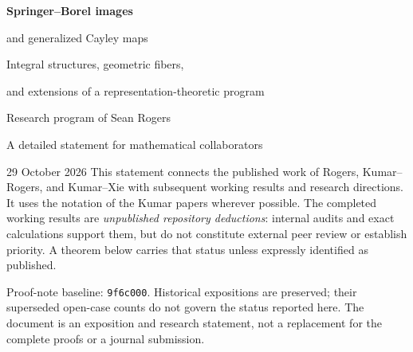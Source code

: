 \documentclass[11pt,letterpaper]{article}
\begin{document}
\hypersetup{pageanchor=false}
\begin{titlepage}
\vspace*{0.6in}
{\Huge\bfseries Springer--Borel images\par and generalized Cayley maps\par}
\vspace{0.3in}
{\Large Integral structures, geometric fibers,\par and extensions of a representation-theoretic program\par}
\vspace{0.4in}
{\large Research program of Sean Rogers\par}
{\large A detailed statement for mathematical collaborators\par}
\vspace{0.2in}
29 October 2026
\vfill
\noindent This statement connects the published work of Rogers, Kumar--Rogers, and Kumar--Xie with subsequent working results and research directions. It uses the notation of the Kumar papers wherever possible. The completed working results are \emph{unpublished repository deductions}: internal audits and exact calculations support them, but do not constitute external peer review or establish priority. A theorem below carries that status unless expressly identified as published.
\par\medskip
\noindent Proof-note baseline: \texttt{9f6c000}. Historical expositions are preserved; their superseded open-case counts do not govern the status reported here. The document is an exposition and research statement, not a replacement for the complete proofs or a journal submission.
\end{titlepage}
\hypersetup{pageanchor=true}
\tableofcontents
\clearpage






\end{document}
